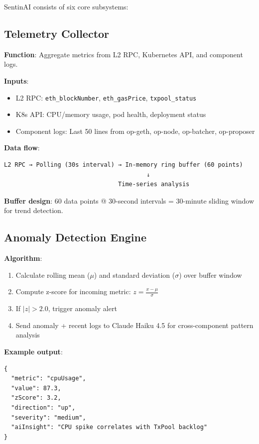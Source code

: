 \documentclass[11pt,a4paper]{article}
\begin{document}
SentinAI consists of six core subsystems:

\subsection{Telemetry Collector}

\textbf{Function}: Aggregate metrics from L2 RPC, Kubernetes API, and component logs.

\textbf{Inputs}:
\begin{itemize}
    \item L2 RPC: \texttt{eth\_blockNumber}, \texttt{eth\_gasPrice}, \texttt{txpool\_status}
    \item K8s API: CPU/memory usage, pod health, deployment status
    \item Component logs: Last 50 lines from op-geth, op-node, op-batcher, op-proposer
\end{itemize}

\textbf{Data flow}:
\begin{verbatim}
L2 RPC → Polling (30s interval) → In-memory ring buffer (60 points)
                                        ↓
                                Time-series analysis
\end{verbatim}

\textbf{Buffer design}: 60 data points @ 30-second intervals = 30-minute sliding window for trend detection.

\subsection{Anomaly Detection Engine}

\textbf{Algorithm}:
\begin{enumerate}
    \item Calculate rolling mean ($\mu$) and standard deviation ($\sigma$) over buffer window
    \item Compute z-score for incoming metric: $z = \frac{x - \mu}{\sigma}$
    \item If $|z| > 2.0$, trigger anomaly alert
    \item Send anomaly + recent logs to Claude Haiku 4.5 for cross-component pattern analysis
\end{enumerate}

\textbf{Example output}:
\begin{lstlisting}
{
  "metric": "cpuUsage",
  "value": 87.3,
  "zScore": 3.2,
  "direction": "up",
  "severity": "medium",
  "aiInsight": "CPU spike correlates with TxPool backlog"
}
\end{lstlisting}
\end{document}
